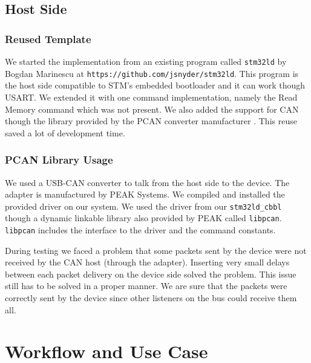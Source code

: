 \documentclass[11pt]{article} %
\begin{document}
\subsection{Host Side}

\subsubsection{Reused Template}
We started the implementation from an existing program called \texttt{stm32ld} by Bogdan Marinescu at \texttt{https://github.com/jsnyder/stm32ld}. This program is the host side compatible to STM's embedded bootloader and it can work though USART. We extended it with one command implementation, namely the Read Memory command which was not present. We also added the support for CAN though the library provided by the PCAN converter manufacturer \cite{ref:pcanmanual}. This reuse saved a lot of development time.


\subsubsection{PCAN Library Usage}
We used a USB-CAN converter to talk from the host side to the device. The adapter is manufactured by PEAK Systems. We compiled and installed the provided driver on our system. We used the driver from our \texttt{stm32ld\_cbbl} though a dynamic linkable library also provided by PEAK called \texttt{libpcan}. \texttt{libpcan} includes the interface to the driver and the command constants.

During testing we faced a problem that some packets sent by the device were not received by the CAN host (through the adapter). Inserting very small delays between each packet delivery on the device side solved the problem. This issue still has to be solved in a proper manner. We are sure that the packets were correctly sent by the device since other listeners on the bus could receive them all.


\section{Workflow and Use Case}
\label{workflow}
\end{document}
